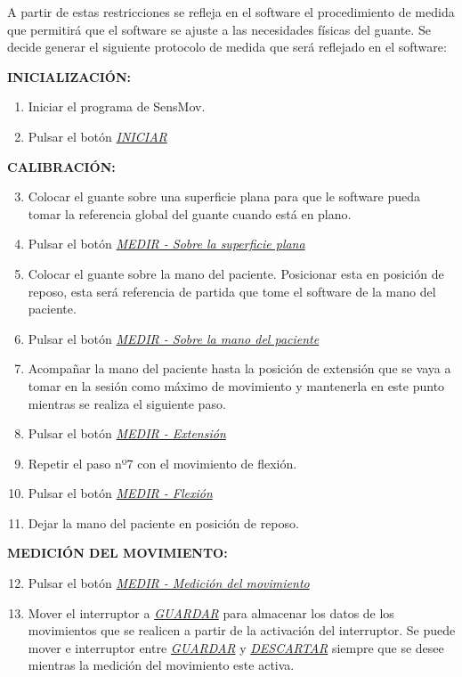 \begin{itemize} [label=]
	A partir de estas restricciones se refleja en el software el procedimiento de medida que permitirá que el software se ajuste a las necesidades físicas del guante. Se decide generar el siguiente protocolo de medida que será reflejado en el software:
	
		\hspace{1cm}\textbf{INICIALIZACIÓN:}
	\begin{enumerate}
		\item Iniciar el programa de SensMov.
		\item Pulsar el botón \textit{\underline{INICIAR}}
	\end{enumerate}	 
		\hspace{1cm}\textbf{CALIBRACIÓN:} 
	\begin{enumerate}
		\setcounter{enumi}{2}
		\item Colocar el guante sobre una superficie plana para que le software pueda tomar la referencia global del guante cuando está en plano.
		\item Pulsar el botón \underline{\textit{MEDIR - Sobre la superficie plana}}
		\item Colocar el guante sobre la mano del paciente. Posicionar esta en posición de reposo, esta será referencia de partida que tome el software de la mano del paciente. 
		\item Pulsar el botón \underline{\textit{MEDIR - Sobre la mano del paciente}}
		\item Acompañar la mano del paciente hasta la posición de extensión que se vaya a tomar en la sesión como máximo de movimiento y mantenerla en este punto mientras se realiza el siguiente paso. 
		\item Pulsar el botón \underline{\textit{MEDIR - Extensión}}
		\item Repetir el paso nº7 con el movimiento de flexión.
		\item Pulsar el botón \underline{\textit{MEDIR - Flexión}}
		\item Dejar la mano del paciente en posición de reposo.
	\end{enumerate}
		\hspace{1cm}\textbf{MEDICIÓN DEL MOVIMIENTO:}
	\begin{enumerate}
		\setcounter{enumi}{11}
		\item Pulsar el botón \underline{\textit{MEDIR - Medición del movimiento}}
		\item Mover el interruptor a \underline{\textit{GUARDAR}} para almacenar los datos de los movimientos que se realicen a partir de la activación del interruptor. Se puede mover e interruptor entre \underline{\textit{GUARDAR}} y \underline{\textit{DESCARTAR}} siempre que se desee mientras la medición del movimiento este activa.  	

\end{enumerate}
\end{itemize}
